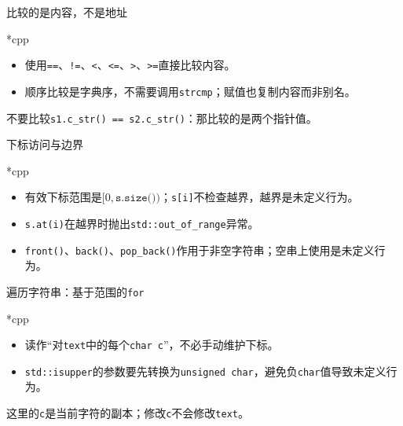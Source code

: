 \begin{frame}{比较的是内容，不是地址}
\begin{Code}*{cpp}\end{Code}
\begin{itemize}
\item 使用\texttt{==}、\texttt{!=}、\texttt{<}、\texttt{<=}、\texttt{>}、\texttt{>=}直接比较内容。
\item 顺序比较是字典序，不需要调用\texttt{strcmp}；赋值也复制内容而非别名。
\end{itemize}
\alert{不要比较\texttt{s1.c\_str() == s2.c\_str()}：那比较的是两个指针值。}
\end{frame}

\begin{frame}{下标访问与边界}
\begin{Code}*{cpp}\end{Code}
\begin{itemize}
\item 有效下标范围是$[0,\texttt{s.size()})$；\texttt{s[i]}不检查越界，越界是未定义行为。
\item \texttt{s.at(i)}在越界时抛出\texttt{std::out\_of\_range}异常。
\item \texttt{front()}、\texttt{back()}、\texttt{pop\_back()}作用于非空字符串；空串上使用是未定义行为。
\end{itemize}
\end{frame}

\begin{frame}{遍历字符串：基于范围的\texttt{for}}
\begin{Code}*{cpp}\end{Code}
\begin{itemize}
\item 读作“对\texttt{text}中的每个\texttt{char c}”，不必手动维护下标。
\item \texttt{std::isupper}的参数要先转换为\texttt{unsigned char}，避免负\texttt{char}值导致未定义行为。
\end{itemize}
\alert{这里的\texttt{c}是当前字符的副本；修改\texttt{c}不会修改\texttt{text}。}
\end{frame}

